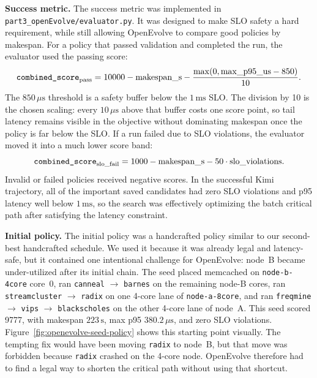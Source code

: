 \begin{enumerate}
\begin{enumerate}
         \smallskip
         \noindent\textbf{Success metric.}
         The success metric was implemented in
         \texttt{part3\_openEvolve/evaluator.py}. It was designed to make SLO
         safety a hard requirement, while still allowing OpenEvolve to compare
         good policies by makespan. For a policy that passed validation and
         completed the run, the evaluator used the passing score:
            $$
             \text{\texttt{combined\_score}}_{\mathrm{pass}}
             = 10000 - \mathrm{makespan\_s}
             - \frac{\max(0,\mathrm{max\_p95\_us}-850)}{10}.
            $$
         The \(850\,\mu\mathrm{s}\) threshold is a safety buffer below the
         \(1\,\mathrm{ms}\) SLO. The division by 10 is the chosen scaling: every
         \(10\,\mu\mathrm{s}\) above that buffer costs one score point, so tail
         latency remains visible in the objective without dominating makespan
         once the policy is far below the SLO. If a run failed due to SLO
         violations, the evaluator moved it into a much lower score band:
         $$
         \text{\texttt{combined\_score}}_{\mathrm{slo\_fail}}
         =
         1000-\mathrm{makespan\_s}-50\cdot\mathrm{slo\_violations}.
         $$
         Invalid or failed policies received negative scores. In the successful
         Kimi trajectory, all of the important saved candidates had zero SLO
         violations and p95 latency well below \(1\,\mathrm{ms}\), so the search
         was effectively optimizing the batch critical path after satisfying the
         latency constraint.

         \smallskip
         \noindent\textbf{Initial policy.}
         The initial policy was a handcrafted policy similar to our second-best
         handcrafted schedule. We used it because it was already legal and
         latency-safe, but it contained one intentional challenge for OpenEvolve:
         node~B became under-utilized after its initial chain. The seed placed
         memcached on \texttt{node-b-4core} core~0, ran \texttt{canneal}
         \(\rightarrow\) \texttt{barnes} on the remaining node-B cores, ran
         \texttt{streamcluster} \(\rightarrow\) \texttt{radix} on one 4-core
         lane of \texttt{node-a-8core}, and ran \texttt{freqmine}
         \(\rightarrow\) \texttt{vips} \(\rightarrow\) \texttt{blackscholes} on
         the other 4-core lane of node~A. This seed scored 9777, with makespan
         \(223\,\mathrm{s}\), max p95 \(380.2\,\mu\mathrm{s}\), and zero SLO
         violations. Figure~\ref{fig:openevolve-seed-policy} shows this
         starting point visually. The tempting fix would have been moving
         \texttt{radix} to node~B, but that move was forbidden because
         \texttt{radix} crashed on the 4-core node. OpenEvolve therefore had to
         find a legal way to shorten the critical path without using that
         shortcut.


\end{enumerate}
\end{enumerate}

